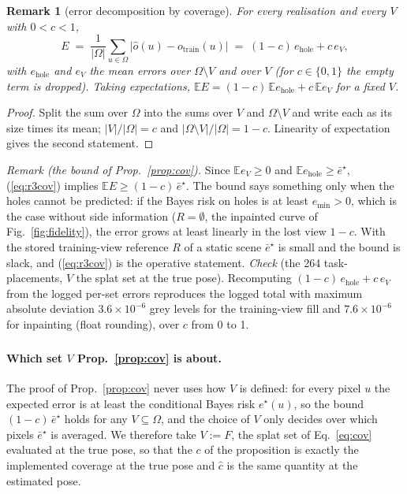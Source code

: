 \documentclass{article}
\newtheorem{remark}{Remark}
\newcommand{\ph}{\textsuperscript{\dag}}
\begin{document}
\begin{remark}[error decomposition by coverage]
\label{prop:r3cov}
For every realisation and every $V$ with $0 < c < 1$,
\begin{equation}
E \;=\; \frac1{|\Omega|}\sum_{u\in\Omega}|\hat o(u) - o_{\mathrm{train}}(u)| \;=\; (1 - c)\,e_{\mathrm{hole}} + c\,e_V,
\label{eq:r3cov}
\end{equation}
with $e_{\mathrm{hole}}$ and $e_V$ the mean errors over $\Omega\setminus V$ and over $V$ (for $c \in \{0, 1\}$ the empty
term is dropped). Taking expectations, $\mathbb{E}E = (1-c)\,\mathbb{E}e_{\mathrm{hole}} + c\,\mathbb{E}e_V$ for a fixed
$V$.
\end{remark}
\begin{proof}
Split the sum over $\Omega$ into the sums over $V$ and $\Omega \setminus V$ and write each as its size times its mean;
$|V|/|\Omega| = c$ and $|\Omega\setminus V|/|\Omega| = 1 - c$. Linearity of expectation gives the second statement.
\end{proof}
\emph{Remark (the bound of Prop.~\ref{prop:cov}).} Since $\mathbb{E}e_V \ge 0$ and $\mathbb{E}e_{\mathrm{hole}} \ge
\bar e^\star$, (\ref{eq:r3cov}) implies $\mathbb{E}E \ge (1-c)\,\bar e^\star$. The bound says something only when the
holes cannot be predicted: if the Bayes risk on holes is at least $e_{\min} > 0$, which is the case without side
information ($R = \emptyset$, the inpainted curve of Fig.~\ref{fig:fidelity}), the error grows at least linearly in the
lost view $1 - c$. With the stored training-view reference $R$ of a static scene $\bar e^\star$ is small and the bound
is slack, and (\ref{eq:r3cov}) is the operative statement. \emph{Check} (the 264
task-placements, $V$ the splat set at the true pose). Recomputing $(1-c)\,e_{\mathrm{hole}} +
c\,e_V$ from the logged per-set errors reproduces the logged total with maximum absolute deviation $3.6\times10^{-6}$
grey levels for the training-view fill and $7.6\times10^{-6}$ for inpainting (float rounding), over $c$ from 0 to 1.

\paragraph{Which set $V$ Prop.~\ref{prop:cov} is about\ph.}
The proof of Prop.~\ref{prop:cov} never uses how $V$ is defined: for every pixel $u$ the expected error is at least
the conditional Bayes risk $e^\star(u)$, so the bound $(1-c)\,\bar e^\star$ holds for any $V \subseteq \Omega$, and the
choice of $V$ only decides over which pixels $\bar e^\star$ is averaged. We therefore take $V := F$, the splat set of
Eq.~\ref{eq:cov} evaluated at the true pose, so that the $c$ of the proposition is exactly the implemented coverage at
the true pose and $\hat c$ is the same quantity at the estimated pose.
\end{document}
